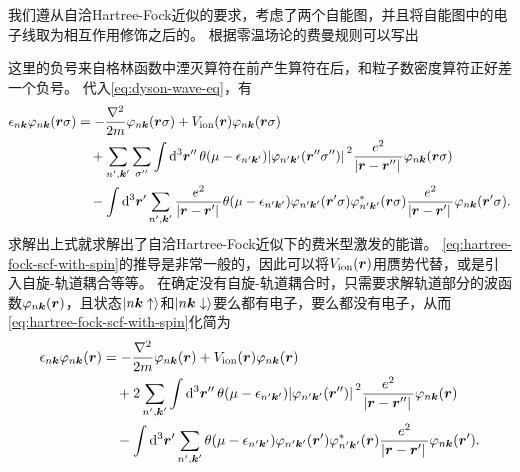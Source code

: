 我们遵从自洽Hartree-Fock近似的要求，考虑了两个自能图，并且将自能图中的电子线取为相互作用修饰之后的。
根据零温场论的费曼规则可以写出

这里的负号来自格林函数中湮灭算符在前产生算符在后，和粒子数密度算符正好差一个负号。
代入\eqref{eq:dyson-wave-eq}，有
\begin{equation}
    \begin{aligned}
        \epsilon_{n \vb*{k}} \varphi_{n \vb*{k}}(\vb*{r} \sigma) &= - \frac{\laplacian}{2m} \varphi_{n \vb*{k}}(\vb*{r} \sigma) + V_\text{ion}(\vb*{r}) \varphi_{n \vb*{k}}(\vb*{r} \sigma) \\
        &\quad +  \sum_{n', \vb*{k}'} \sum_{\sigma''} \int \dd[3]{\vb*{r}''} \theta(\mu - \epsilon_{n' \vb*{k}'}) \abs*{\varphi_{n' \vb*{k}'}(\vb*{r}'' \sigma'')}^2 \frac{e^2}{\abs*{\vb*{r} - \vb*{r}''}} \varphi_{n \vb*{k}}(\vb*{r} \sigma) \\
        &\quad - \int \dd[3]{\vb*{r}'} \sum_{n', \vb*{k}'} \frac{e^2}{\abs*{\vb*{r} - \vb*{r}'}} \theta(\mu - \epsilon_{n' \vb*{k}'}) \varphi_{n' \vb*{k}'}(\vb*{r}' \sigma) \varphi^*_{n' \vb*{k}'}(\vb*{r} \sigma) \frac{e^2}{\abs*{\vb*{r} - \vb*{r}'}} \varphi_{n \vb*{k}}(\vb*{r}' \sigma) .
    \end{aligned}
    \label{eq:hartree-fock-scf-with-spin}
\end{equation}
求解出上式就求解出了自洽Hartree-Fock近似下的费米型激发的能谱。
\eqref{eq:hartree-fock-scf-with-spin}的推导是非常一般的，因此可以将$V_\text{ion}(\vb*{r})$用赝势代替，或是引入自旋-轨道耦合等等。
在确定没有自旋-轨道耦合时，只需要求解轨道部分的波函数$\varphi_{n \vb*{k}}(\vb*{r})$，且状态$\ket{n \vb*{k} \uparrow}$和$\ket{n \vb*{k} \downarrow}$要么都有电子，要么都没有电子，从而\eqref{eq:hartree-fock-scf-with-spin}化简为
\begin{equation}
    \begin{aligned}
        \epsilon_{n \vb*{k}} \varphi_{n \vb*{k}}(\vb*{r}) &= - \frac{\laplacian}{2m} \varphi_{n \vb*{k}}(\vb*{r}) + V_\text{ion}(\vb*{r}) \varphi_{n \vb*{k}}(\vb*{r}) \\
        &\quad + 2 \sum_{n', \vb*{k}'} \int \dd[3]{\vb*{r}''} \theta(\mu - \epsilon_{n' \vb*{k}'}) \abs*{\varphi_{n' \vb*{k}'}(\vb*{r}'' )}^2 \frac{e^2}{\abs*{\vb*{r} - \vb*{r}''}} \varphi_{n \vb*{k}}(\vb*{r} ) \\
        &\quad - \int \dd[3]{\vb*{r}'} \sum_{n', \vb*{k}'} \theta(\mu - \epsilon_{n' \vb*{k}'}) \varphi_{n' \vb*{k}'}(\vb*{r}' ) \varphi^*_{n' \vb*{k}'}(\vb*{r} ) \frac{e^2}{\abs*{\vb*{r} - \vb*{r}'}} \varphi_{n \vb*{k}}(\vb*{r}' ) .
    \end{aligned}
    \label{eq:hartree-fock-scf-spinless}
\end{equation}

